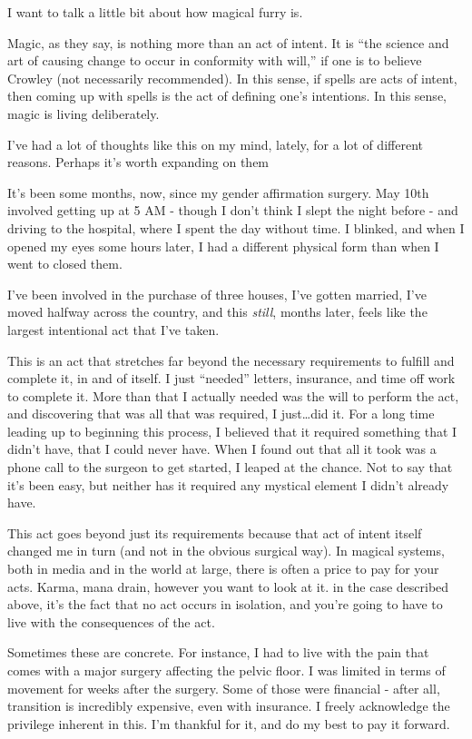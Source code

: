 
I want to talk a little bit about how magical furry is.

Magic, as they say, is nothing more than an act of intent. It is ``the science and art of causing change to occur in conformity with will,'' if one is to believe Crowley (not necessarily recommended). In this sense, if spells are acts of intent, then coming up with spells is the act of defining one's intentions. In this sense, magic is living deliberately.

I've had a lot of thoughts like this on my mind, lately, for a lot of different reasons. Perhaps it's worth expanding on them

It's been some months, now, since my gender affirmation surgery. May 10th involved getting up at 5 AM - though I don't think I slept the night before - and driving to the hospital, where I spent the day without time. I blinked, and when I opened my eyes some hours later, I had a different physical form than when I went to closed them.

I've been involved in the purchase of three houses, I've gotten married, I've moved halfway across the country, and this \emph{still}, months later, feels like the largest intentional act that I've taken.

This is an act that stretches far beyond the necessary requirements to fulfill and complete it, in and of itself. I just ``needed'' letters, insurance, and time off work to complete it. More than that I actually needed was the will to perform the act, and discovering that was all that was required, I just\ldots{}did it. For a long time leading up to beginning this process, I believed that it required something that I didn't have, that I could never have. When I found out that all it took was a phone call to the surgeon to get started, I leaped at the chance. Not to say that it's been easy, but neither has it required any mystical element I didn't already have.

This act goes beyond just its requirements because that act of intent itself changed me in turn (and not in the obvious surgical way). In magical systems, both in media and in the world at large, there is often a price to pay for your acts. Karma, mana drain, however you want to look at it. in the case described above, it's the fact that no act occurs in isolation, and you're going to have to live with the consequences of the act.

Sometimes these are concrete. For instance, I had to live with the pain that comes with a major surgery affecting the pelvic floor. I was limited in terms of movement for weeks after the surgery. Some of those were financial - after all, transition is incredibly expensive, even with insurance. I freely acknowledge the privilege inherent in this. I'm thankful for it, and do my best to pay it forward.

